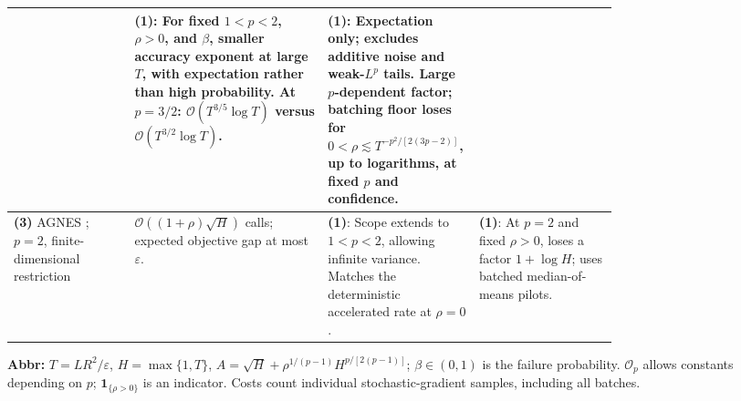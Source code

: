 \begin{table}[tp]
\begin{threeparttable}
\begin{tabularx}{\linewidth}{@{}>{\raggedright\arraybackslash}p{0.20\linewidth}>{\raggedright\arraybackslash}p{0.32\linewidth}>{\raggedright\arraybackslash}p{0.25\linewidth}>{\raggedright\arraybackslash}X@{}}
& \textbf{(1)}: For fixed $1<p<2$, $\rho>0$, and $\beta$, smaller accuracy exponent at large $T$, with expectation rather than high probability. At $p=3/2$: $\mathcal{O}(T^{3/5}\log T)$ versus $\mathcal{O}(T^{3/2}\log T)$.
& \textbf{(1)}: Expectation only; excludes additive noise and weak-$L^p$ tails. Large $p$-dependent factor; batching floor loses for $0<\rho\lesssim T^{-p^2/[2(3p-2)]}$, up to logarithms, at fixed $p$ and confidence. \\
\midrule
\textbf{(3)} AGNES \citep[Theorem 3]{sgmssGupta2024v3}; $p=2$, finite-dimensional restriction
& $\mathcal{O}\!\left((1+\rho)\sqrt H\right)$ calls; expected objective gap at most $\varepsilon$.
& \textbf{(1)}: Scope extends to $1<p<2$, allowing infinite variance. Matches the deterministic accelerated rate at $\rho=0$.
& \textbf{(1)}: At $p=2$ and fixed $\rho>0$, loses a factor $1+\log H$; uses batched median-of-means pilots. \\
\bottomrule
\end{tabularx}
\begin{tablenotes}[flushleft]\footnotesize
\item[] \textbf{Abbr:} $T=LR^2/\varepsilon$, $H=\max\{1,T\}$, $A=\sqrt H+\rho^{1/(p-1)}H^{p/[2(p-1)]}$; $\beta\in(0,1)$ is the failure probability. $\mathcal{O}_p$ allows constants depending on $p$; $\mathbf{1}_{\{\rho>0\}}$ is an indicator. Costs count individual stochastic-gradient samples, including all batches.
\end{tablenotes}
\end{threeparttable}
\end{table}
